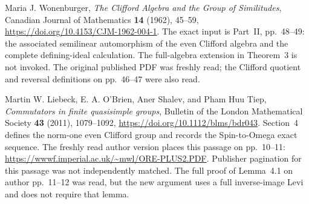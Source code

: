 Maria J. Wonenburger,
\emph{The Clifford Algebra and the Group of Similitudes},
Canadian Journal of Mathematics \textbf{14} (1962), 45--59,
\url{https://doi.org/10.4153/CJM-1962-004-1}.
The exact input is Part~II, pp.~48--49: the associated semilinear
automorphism of the even Clifford algebra and the complete defining-ideal
calculation. The full-algebra extension in Theorem~3 is not invoked.
The original published PDF was freshly read; the Clifford quotient and
reversal definitions on pp.~46--47 were also read.

Martin W. Liebeck, E. A. O'Brien, Aner Shalev, and Pham Huu Tiep,
\emph{Commutators in finite quasisimple groups},
Bulletin of the London Mathematical Society \textbf{43} (2011), 1079--1092,
\url{https://doi.org/10.1112/blms/bdr043}.
Section~4 defines the norm-one even Clifford group and records the
Spin-to-Omega exact sequence. The freshly read author version places
this passage on pp.~10--11:
\url{https://wwwf.imperial.ac.uk/~mwl/ORE-PLUS2.PDF}.
Publisher pagination for this passage was not independently matched.
The full proof of Lemma~4.1 on author pp.~11--12 was read, but the
new argument uses a full inverse-image Levi and does not require that lemma.

